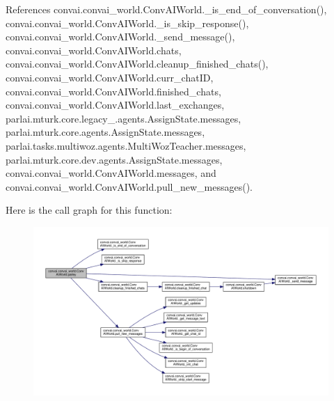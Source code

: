 References convai.\+convai\+\_\+world.\+Conv\+A\+I\+World.\+\_\+is\+\_\+end\+\_\+of\+\_\+conversation(), convai.\+convai\+\_\+world.\+Conv\+A\+I\+World.\+\_\+is\+\_\+skip\+\_\+response(), convai.\+convai\+\_\+world.\+Conv\+A\+I\+World.\+\_\+send\+\_\+message(), convai.\+convai\+\_\+world.\+Conv\+A\+I\+World.\+chats, convai.\+convai\+\_\+world.\+Conv\+A\+I\+World.\+cleanup\+\_\+finished\+\_\+chats(), convai.\+convai\+\_\+world.\+Conv\+A\+I\+World.\+curr\+\_\+chat\+ID, convai.\+convai\+\_\+world.\+Conv\+A\+I\+World.\+finished\+\_\+chats, convai.\+convai\+\_\+world.\+Conv\+A\+I\+World.\+last\+\_\+exchanges, parlai.\+mturk.\+core.\+legacy\+\_.\+agents.\+Assign\+State.\+messages, parlai.\+mturk.\+core.\+agents.\+Assign\+State.\+messages, parlai.\+tasks.\+multiwoz.\+agents.\+Multi\+Woz\+Teacher.\+messages, parlai.\+mturk.\+core.\+dev.\+agents.\+Assign\+State.\+messages, convai.\+convai\+\_\+world.\+Conv\+A\+I\+World.\+messages, and convai.\+convai\+\_\+world.\+Conv\+A\+I\+World.\+pull\+\_\+new\+\_\+messages().

Here is the call graph for this function\+:
\nopagebreak
\begin{figure}[H]
\begin{center}
\leavevmode
\includegraphics[width=350pt]{classconvai_1_1convai__world_1_1ConvAIWorld_a3cb70be6e7c878cf78041ed2722b9238_cgraph}
\end{center}
\end{figure}
\mbox{\label{classconvai_1_1convai__world_1_1ConvAIWorld_a06a6127d5bfcc3bd03b4913b1667e659}} 

